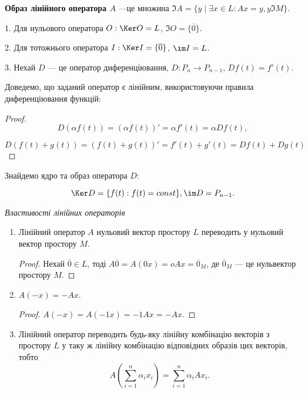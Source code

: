 \begin{definition}
	\textbf{Образ лінійного оператора $A$} ---це множина
	$\Im A = \{y \mid \exists x \in L: Ax = y, y \Im M\}$.
\end{definition}

\begin{example}
	1. Для нульового оператора $O: \Ker O = L$, $\Im O = \{\overline{0}\}$.
	
	2. Для тотожнього оператора $I: \Ker I = \{\overline{0}\}$, $\im I = L$.

	3. Нехай $D$ --- це оператор диференціювання, $D: P_n \rightarrow P_{n-1}$, $Df(t) = f'(t)$.
\end{example}

Доведемо, що заданий оператор є лінійним, використовуючи правила
диференціювання функцій: 
\begin{proof}
	$$D(\alpha f(t)) = (\alpha f(t))' = \alpha f'(t) = \alpha D f(t),$$

	$$D(f(t) + g(t)) = (f(t) + g(t))' = f'(t) + g'(t) = D f(t) + D g(t)$$
\end{proof}


Знайдемо ядро та образ оператора $D$:

$$\Ker D = \{f(t): f(t) = const\}, \im D = P_{n-1}.$$


\textit{Властивості лінійних операторів}
\begin{enumerate}
	\item Лінійний оператор $A$ нульовий вектор простору $L$ переводить у нульовий
	вектор простору $M$.
	\begin{proof}
		Нехай $\overline{0} \in L$, тоді $A\overline{0} = A(0 x) = o A x = \overline{0}_M$, де $\overline{0}_M$ --- це нульвектор простору $M$.
	\end{proof}

	\item $A(-x) = -A x$.
	\begin{proof}
		$A(-x) = A(-1x) = -1 A x = -Ax$.
	\end{proof}

	\item Лінійний оператор переводить будь-яку лінійну комбінацію векторів з
	простору $L$ у таку ж лінійну комбінацію відповідних образів цих векторів, тобто
	$$A\left( \sum\limits_{i=1}^n \alpha_i x_i \right) = \sum\limits_{i=1}^n \alpha_i A x_i.$$
\end{enumerate}

